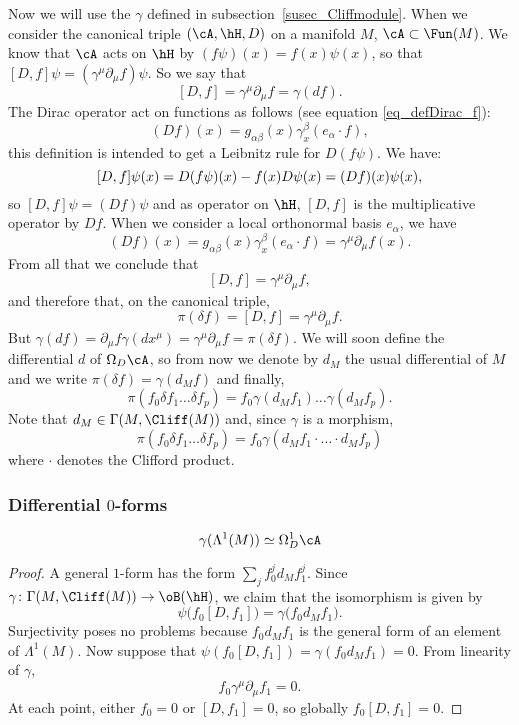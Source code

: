 Now we will use the $\gamma$ defined in subsection~\ref{susec_Cliffmodule}. When we consider the canonical triple $(\cA,\hH,D)$ on a manifold $M$, $\cA\subset\Fun(M)$. We know that $\cA$ acts on $\hH$ by $(f\psi)(x)=f(x)\psi(x)$, so that $[D,f]\psi=(\gamma^{\mu}\partial_{\mu}f)\psi$. So we say that
\[
  [D,f]=\gamma^{\mu}\partial_{\mu}f=\gamma(df).
\]
The Dirac operator act on functions as follows (see equation \eqref{eq_defDirac_f}):
\[
  (Df)(x)=g_{\alpha\beta}(x)\gamma^{\beta}_x(e_{\alpha}\cdot f),
\]
this definition is intended to get a Leibnitz rule for $D(f\psi)$. We have:
\[
[D,f]\psi(x)=D(f\psi)(x)-f(x)D\psi(x)\\
		=(Df)(x)\psi(x),
\]
so $[D,f]\psi=(Df)\psi$ and as operator on $\hH$, $[D,f]$ is the multiplicative operator by $Df$. When we consider a local orthonormal basis $e_{\alpha}$, we have
\[
(Df)(x)=g_{\alpha\beta}(x)\gamma_x^{\beta}(e_{\alpha}\cdot f)
		=\gamma^{\mu}\partial_{\mu}f(x).
\]
From all that we conclude that
\[
  [D,f]=\gamma^{\mu}\partial_{\mu}f,
\]
and therefore that, on the canonical triple,
\begin{equation}
\pi(\delta f)=[D,f]=\gamma^{\mu}\partial_{\mu}f.
\end{equation}
But $\gamma(df)=\partial_{\mu}f\gamma(dx^{\mu})=\gamma^{\mu}\partial_{\mu}f=\pi(\delta f)$. We will soon define the differential $d$ of $\Omega_D\cA$, so from now we denote by $d_M$ the usual differential of $M$ and we write $\pi(\delta f)=\gamma(d_Mf)$ and finally,
\begin{equation}
\pi(f_0\delta f_1\ldots \delta f_p)=f_0\gamma(d_Mf_1)\ldots\gamma(d_Mf_p).
\end{equation}
Note that $d_M\in\Gamma(M,\Cliff(M))$ and, since $\gamma$ is a morphism,
\begin{equation} \label{EqpildotsdeltagamdM}
  \pi(f_0\delta f_1\ldots\delta f_p)=f_0\gamma(d_Mf_1\cdot\ldots\cdot d_Mf_p)
\end{equation}
where $\cdot$ denotes the Clifford product.


\subsubsection{Differential \texorpdfstring{$0$}{0}-forms}

\begin{lemma}
\[
\gamma(\Lambda^1(M))\simeq\Omega^1_D\cA
\]
\end{lemma}

\begin{proof}

A general $1$-form has the form $\sum_j f_0^jd_Mf_1^j$. Since $\gamma\colon \Gamma(M,\Cliff(M))\to \oB(\hH)$, we claim that the isomorphism is given by
\[
  \psi\big( f_0[D,f_1] \big)=\gamma\big( f_0d_Mf_1 \big).
\]
Surjectivity poses no problems because $f_0d_Mf_1$ is the general form of an element of $\Lambda^1(M)$. Now suppose that $\psi(f_0[D,f_1])=\gamma(f_0d_Mf_1)=0$. From linearity of $\gamma$,
\[
  f_0\gamma^{\mu}\partial_{\mu}f_1=0.
\]
At each point, either $f_0=0$ or $[D,f_1]=0$, so globally $f_0[D,f_1]=0$.
\end{proof}

